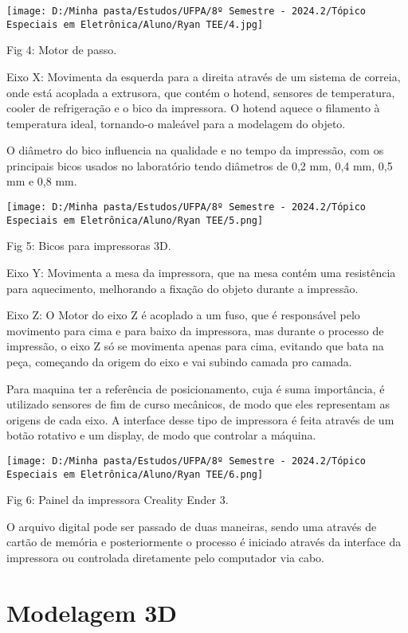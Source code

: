 \documentclass[
]{book}
\begin{document}
\texttt{[image: D:/Minha pasta/Estudos/UFPA/8º Semestre - 2024.2/Tópico Especiais em Eletrônica/Aluno/Ryan TEE/4.jpg]}

Fig 4: Motor de passo.

Eixo X: Movimenta da esquerda para a direita através de um sistema de correia, onde está acoplada a extrusora, que contém o hotend, sensores de temperatura, cooler de refrigeração e o bico da impressora. O hotend aquece o filamento à temperatura ideal, tornando-o maleável para a modelagem do objeto.

O diâmetro do bico influencia na qualidade e no tempo da impressão, com os principais bicos usados no laboratório tendo diâmetros de 0,2 mm, 0,4 mm, 0,5 mm e 0,8 mm.

\texttt{[image: D:/Minha pasta/Estudos/UFPA/8º Semestre - 2024.2/Tópico Especiais em Eletrônica/Aluno/Ryan TEE/5.png]}

Fig 5: Bicos para impressoras 3D.

Eixo Y: Movimenta a mesa da impressora, que na mesa contém uma resistência para aquecimento, melhorando a fixação do objeto durante a impressão.

Eixo Z: O Motor do eixo Z é acoplado a um fuso, que é responsável pelo movimento para cima e para baixo da impressora, mas durante o processo de impressão, o eixo Z só se movimenta apenas para cima, evitando que bata na peça, começando da origem do eixo e vai subindo camada pro camada.

Para maquina ter a referência de posicionamento, cuja é suma importância, é utilizado sensores de fim de curso mecânicos, de modo que eles representam as origens de cada eixo. A interface desse tipo de impressora é feita através de um botão rotativo e um display, de modo que controlar a máquina.

\texttt{[image: D:/Minha pasta/Estudos/UFPA/8º Semestre - 2024.2/Tópico Especiais em Eletrônica/Aluno/Ryan TEE/6.png]}

Fig 6: Painel da impressora Creality Ender 3.

O arquivo digital pode ser passado de duas maneiras, sendo uma através de cartão de memória e posteriormente o processo é iniciado através da interface da impressora ou controlada diretamente pelo computador via cabo.

\section{Modelagem 3D}\label{modelagem-3d}
\end{document}
